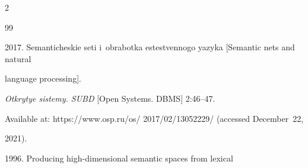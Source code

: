   \begin{multicols}{2}





\renewcommand{\bibname}{\protect\rmfamily References}







{\small\frenchspacing


 {%




 \begin{thebibliography}{99}


 


 \vspace*{-1pt}


 






















 2017. Semanticheskie seti i~obrabotka estestvennogo yazyka [Semantic nets and natural 


language processing].


\textit{Otkrytye sistemy. SUBD} [Open Systems. DBMS] 2:46--47.


 Available at: {\sf https://www.osp.ru/os/ 2017/02/13052229/} (accessed December~22, 


2021).




 1996. Producing high-dimensional semantic spaces from lexical  



\end{thebibliography}}}
\end{multicols}
